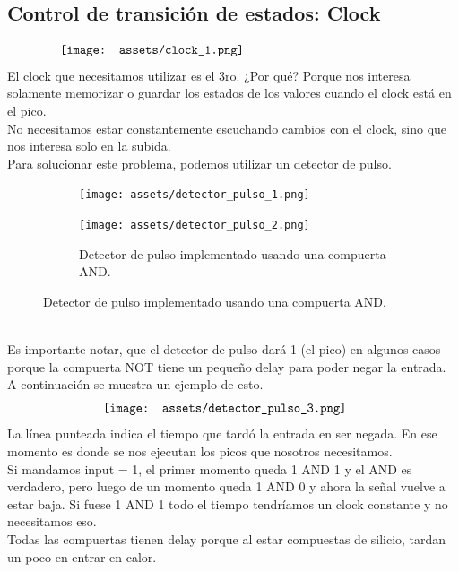 \documentclass[10pt,a4paper]{article}
\begin{document}
\subsection*{Control de transición de estados: Clock}
\[\begin{minipage}[b]{0.8\textwidth}
    \texttt{[image: assets/clock\_1.png]}
    \label{fig:clock_1}
\end{minipage}\]
El clock que necesitamos utilizar es el 3ro. ¿Por qué? Porque nos interesa solamente memorizar o guardar los estados de los valores cuando el clock está en el pico. \\
No necesitamos estar constantemente escuchando cambios con el clock, sino que nos interesa solo en la subida.
\\
Para solucionar este problema, podemos utilizar un detector de pulso.
\begin{figure}[h]
    \begin{subfigure}{0.4\textwidth}
        \centering
        \texttt{[image: assets/detector\_pulso\_1.png]}
        \label{fig:detector_pulso_1}
        \end{subfigure}
    \begin{subfigure}{0.7\textwidth}
        \centering
    \texttt{[image: assets/detector\_pulso\_2.png]}
    \caption{Detector de pulso implementado usando una compuerta AND. }
    \label{fig:detector_pulso_2}
    \end{subfigure}
    \end{figure}
\\ Es importante notar, que el detector de pulso dará 1 (el pico) en algunos casos porque la compuerta NOT tiene un pequeño delay para poder negar la entrada. A continuación se muestra un ejemplo de esto.
\[\begin{minipage}[b]{0.6\textwidth}
    \texttt{[image: assets/detector\_pulso\_3.png]}
    \label{fig:detector_pulso_3}
\end{minipage}\]
La línea punteada indica el tiempo que tardó la entrada en ser negada. En ese momento es donde se nos ejecutan los picos que nosotros necesitamos. \\
Si mandamos input = 1, el primer momento queda 1 AND 1 y el AND es verdadero, pero luego de un momento queda 1 AND 0 y ahora la señal vuelve a estar baja. Si fuese 1 AND 1 todo el tiempo tendríamos un clock constante y no necesitamos eso. \\
Todas las compuertas tienen delay porque al estar compuestas de silicio, tardan un poco en entrar en calor.\\
\end{document}
